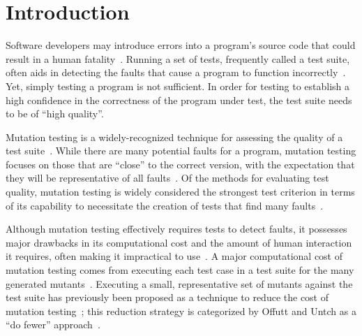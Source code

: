 
\section{Introduction}



Software developers may introduce errors into a program's source code that could result in a human
fatality~\cite{vicente2003programming}. Running a set of tests, frequently called a test suite, often aids in detecting
the faults that cause a program to function incorrectly~\cite{wagner2005comparing}. Yet, simply testing a program is not
sufficient. In order for testing to establish a high confidence in the correctness of the program under test, the test
suite needs to be of ``high quality''.


Mutation testing is a widely-recognized technique for assessing the quality of a test suite~\cite{gopinath2015mutation}.
While there are many potential faults for a program, mutation testing focuses on those that are ``close'' to the correct
version, with the expectation that they will be representative of all faults~\cite{jia2011analysis}. Of the methods for
evaluating test quality, mutation testing is widely considered the strongest test criterion in terms of its capability
to necessitate the creation of tests that find many faults~\cite{ammann2008introduction}.


Although mutation testing effectively requires tests to detect faults, it possesses major drawbacks in its computational
cost and the amount of human interaction it requires, often making it impractical to use~\cite{gopinath2015mutation,
wong1995reducing, gopinath2015empirical}.  A major computational cost of mutation testing comes from executing each test
case in a test suite for the many generated mutants~\cite{offutt1993experimental}. Executing a small, representative set
of mutants against the test suite has previously been proposed as a technique to reduce the cost of mutation
testing~\cite{jia2011analysis, wong1995reducing, offutt1993experimental}; this reduction strategy is categorized by
Offutt and Untch as a ``do fewer'' approach~\cite{offutt2001mutation}.

